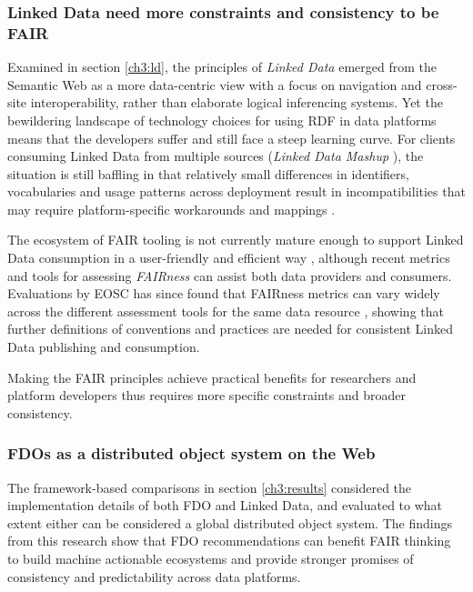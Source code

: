 \subsubsection{Linked Data need more constraints and consistency to be FAIR}

Examined in section \vref{ch3:ld}, the principles of \emph{Linked Data} emerged from the Semantic Web as a more data-centric view with a focus on navigation and cross-site interoperability, rather than elaborate logical inferencing systems.  
Yet the bewildering landscape of technology choices for using RDF in data platforms means that the developers suffer and still face a steep learning curve. 
For clients consuming Linked Data from multiple sources (\emph{Linked Data Mashup} \cite{Tran 2014}), the situation is still baffling in that relatively small differences in identifiers, vocabularies and usage patterns across deployment result in incompatibilities that may require platform-specific workarounds and mappings \cite{Millard 2010}. 

The ecosystem of FAIR tooling is not currently mature enough to support Linked Data consumption in a user-friendly and efficient way \cite{Thompson 2020}, although recent metrics and tools for assessing \emph{FAIRness} \cite{Wilkinson 2018} can assist both data providers and consumers. 
Evaluations by EOSC has since found that FAIRness metrics can vary widely across the different assessment tools for the same data resource \cite{10.5281/zenodo.7463421}, showing that further definitions of conventions and practices are needed for consistent Linked Data publishing and consumption. 

Making the FAIR principles achieve practical benefits for researchers and platform developers thus requires more specific constraints and broader consistency.

\subsubsection{FDOs as a distributed object system on the Web}

The framework-based comparisons in section \vref{ch3:results} considered the implementation details of both FDO and Linked Data, and evaluated to what extent either can be considered a global distributed object system. 
The findings from this research show that FDO recommendations can benefit FAIR thinking to build machine actionable ecosystems and provide stronger promises of consistency and predictability across data platforms. 

